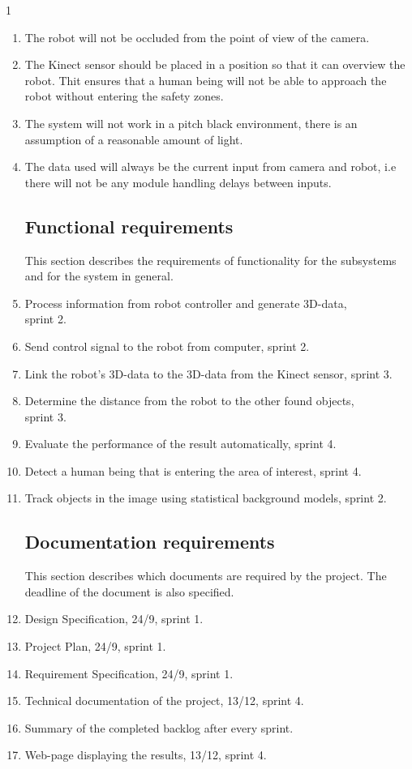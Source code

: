 1\documentclass[10pt,a4paper]{article}
\begin{document}
\begin{enumerate}
\item The robot will not be occluded from the point of view of the camera.

\item The Kinect sensor should be placed in a position so that it can overview the robot. Thit ensures that a human being will not be able to approach the robot without entering the safety zones.

\item The system will not work in a pitch black environment, there is an assumption of a reasonable amount of light.

\item The data used will always be the current input from camera and robot, i.e there will not be any module handling delays between inputs.

\subsection{Functional requirements}
This section describes the requirements of functionality for the subsystems and for the system in general.
\item Process information from robot controller and generate 3D-data, \\sprint 2.
\item Send control signal to the robot from computer, sprint 2.
\item Link the robot's 3D-data to the 3D-data from the Kinect sensor, sprint 3.

\item Determine the distance from the robot to the other found objects, \\sprint 3.

\item Evaluate the performance of the result automatically, sprint 4.

\item Detect a human being that is entering the area of interest, sprint 4.

\item Track objects in the image using statistical background models, sprint 2.

\subsection{Documentation requirements}
This section describes which documents are required by the project. The deadline of the document is also specified.
\item Design Specification, 24/9, sprint 1.
\item Project Plan, 24/9, sprint 1.
\item Requirement Specification, 24/9, sprint 1.
\item Technical documentation of the project, 13/12,  sprint 4.
\item Summary of the completed backlog after every sprint.
\item Web-page displaying the results, 13/12, sprint 4.




\end{enumerate}
\end{document}
